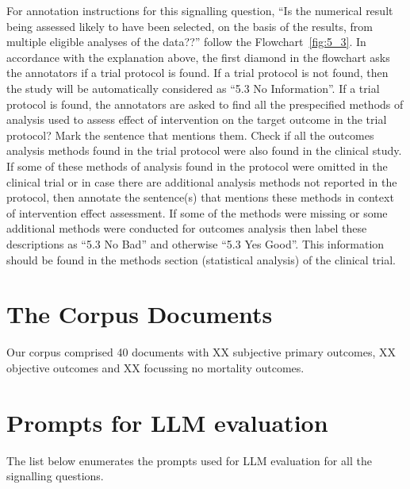\documentclass[sn-mathphys,Numbered]{sn-jnl}%
\begin{document}
For annotation instructions for this signalling question, ``Is the numerical result being assessed likely to have been selected, on the basis of the results, from multiple eligible analyses of the data??'' follow the Flowchart~\ref{fig:5_3}.
In accordance with the explanation above, the first diamond in the flowchart asks the annotators if a trial protocol is found.
If a trial protocol is not found, then the study will be automatically considered as ``5.3 No Information''.
If a trial protocol is found, the annotators are asked to find all the prespecified methods of analysis used to assess effect of intervention on the target outcome in the trial protocol?
Mark the sentence that mentions them.
Check if all the outcomes analysis methods found in the trial protocol were also found in the clinical study.
If some of these  methods of analysis found in the protocol were omitted in the clinical trial or in case there are additional analysis methods not reported in the protocol, then annotate the sentence(s) that mentions these methods in context of intervention effect assessment.
If some of the methods were missing or some additional methods were conducted for outcomes analysis then label these descriptions as ``5.3 No Bad'' and otherwise ``5.3 Yes Good''.
This information should be found in the methods section (statistical analysis) of the clinical trial.
%
%
%
\section*{The Corpus Documents}
\label{sec:corpus}
%
Our corpus comprised 40 documents with XX subjective primary outcomes, XX objective outcomes and XX focussing no mortality outcomes.
%
%
%
\section*{Prompts for LLM evaluation}
\label{sec:llms}
%
The list below enumerates the prompts used for LLM evaluation for all the signalling questions.
\end{document}
